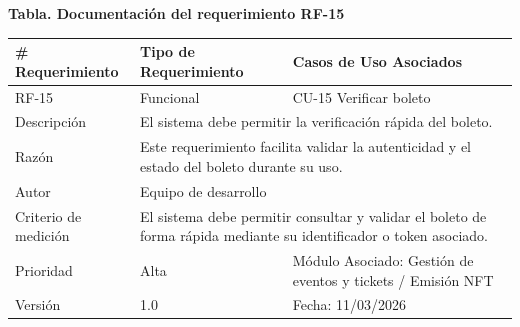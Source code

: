 \documentclass[12pt,letterpaper]{article}
\begin{document}
\noindent
\begin{minipage}{\textwidth}
\centering
\scriptsize
\renewcommand{\arraystretch}{0.9}
\setlength{\tabcolsep}{3pt}
\setlength{\arrayrulewidth}{0.5pt}

\textbf{Tabla. Documentación del requerimiento RF-15}

\vspace{2pt}

\begin{tabularx}{\textwidth}{|p{2.6cm}|X|p{3.4cm}|}
\hline
\# Requerimiento & Tipo de Requerimiento & Casos de Uso Asociados \\ \hline
RF-15 & Funcional & CU-15 Verificar boleto \\ \hline
Descripción & \multicolumn{2}{X|}{El sistema debe permitir la verificación rápida del boleto.} \\ \hline
Razón & \multicolumn{2}{X|}{Este requerimiento facilita validar la autenticidad y el estado del boleto durante su uso.} \\ \hline
Autor & \multicolumn{2}{X|}{Equipo de desarrollo} \\ \hline
Criterio de medición & \multicolumn{2}{X|}{El sistema debe permitir consultar y validar el boleto de forma rápida mediante su identificador o token asociado.} \\ \hline
Prioridad & Alta & Módulo Asociado: Gestión de eventos y tickets / Emisión NFT \\ \hline
Versión & 1.0 & Fecha: 11/03/2026 \\ \hline
\end{tabularx}
\end{minipage}

\vspace{0.2cm}
\end{document}
